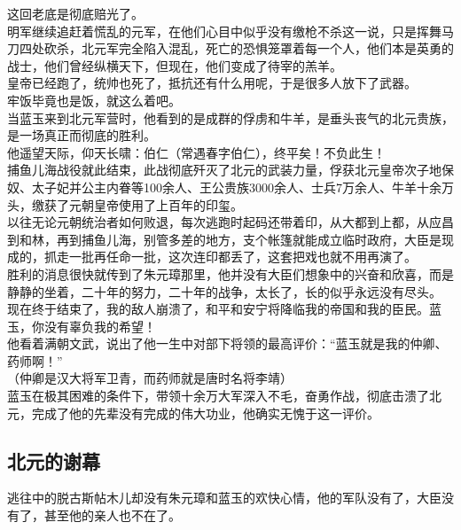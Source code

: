 \begin{multicols}{\theparacolNo}
这回老底是彻底赔光了。\\

明军继续追赶着慌乱的元军，在他们心目中似乎没有缴枪不杀这一说，只是挥舞马刀四处砍杀，北元军完全陷入混乱，死亡的恐惧笼罩着每一个人，他们本是英勇的战士，他们曾经纵横天下，但现在，他们变成了待宰的羔羊。\\

皇帝已经跑了，统帅也死了，抵抗还有什么用呢，于是很多人放下了武器。\\

牢饭毕竟也是饭，就这么着吧。\\

当蓝玉来到北元军营时，他看到的是成群的俘虏和牛羊，是垂头丧气的北元贵族，是一场真正而彻底的胜利。\\

他遥望天际，仰天长啸：伯仁（常遇春字伯仁），终平矣！不负此生！\\

捕鱼儿海战役就此结束，此战彻底歼灭了北元的武装力量，俘获北元皇帝次子地保奴、太子妃并公主内眷等100余人、王公贵族3000余人、士兵7万余人、牛羊十余万头，缴获了元朝皇帝使用了上百年的印玺。\\

以往无论元朝统治者如何败退，每次逃跑时起码还带着印，从大都到上都，从应昌到和林，再到捕鱼儿海，别管多差的地方，支个帐篷就能成立临时政府，大臣是现成的，抓走一批再任命一批，这次连印都丢了，这套把戏也就不用再演了。\\

胜利的消息很快就传到了朱元璋那里，他并没有大臣们想象中的兴奋和欣喜，而是静静的坐着，二十年的努力，二十年的战争，太长了，长的似乎永远没有尽头。\\

现在终于结束了，我的敌人崩溃了，和平和安宁将降临我的帝国和我的臣民。蓝玉，你没有辜负我的希望！\\

他看着满朝文武，说出了他一生中对部下将领的最高评价：“蓝玉就是我的仲卿、药师啊！”\\

（仲卿是汉大将军卫青，而药师就是唐时名将李靖）\\

蓝玉在极其困难的条件下，带领十余万大军深入不毛，奋勇作战，彻底击溃了北元，完成了他的先辈没有完成的伟大功业，他确实无愧于这一评价。\\

\subsection{北元的谢幕}
逃往中的脱古斯帖木儿却没有朱元璋和蓝玉的欢快心情，他的军队没有了，大臣没有了，甚至他的亲人也不在了。\\


\end{multicols}

